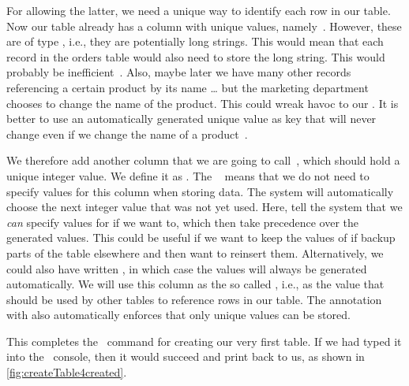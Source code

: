 For allowing the latter, we need a unique way to identify each row in our table.
Now our table already has a column with unique values, namely~.
However, these are of type , i.e., they are potentially long strings.
This would mean that each record in the orders table would also need to store the long  string.
This would probably be inefficient~\cite{SE:DA:2014VPKM}.
Also, maybe later we have many other records referencing a certain product by its name {\dots} but the marketing department chooses to change the name of the product.
This could wreak havoc to our \db.
It is better to use an automatically generated unique value as key that will never change even if we change the name of a product~\cite{B2025DS:SBPASG}.%
%
\begin{sloppypar}%
We therefore add another column that we are going to call~, which should hold a unique integer value.
We define it as .
The ~\cite{PGDG:PD:IC,PGDG:PD:GC} means that we do not need to specify values for this column when storing data.
The system will automatically choose the next integer value that was not yet used.
Here,  tell the system that we \emph{can} specify values for  if we want to, which then take precedence over the generated values.
This could be useful if we want to keep the values of  if backup parts of the table elsewhere and then want to reinsert them.
Alternatively, we could also have written , in which case the  values will always be generated automatically.
We will use this column as the so called , i.e., as the value that should be used by other tables to reference rows in our  table.
The annotation with  also automatically enforces that only unique values can be stored.%
\end{sloppypar}%
%
%
%
%
%
This completes the \sql\ command for creating our very first table.
If we had typed it into the \psql\ console, then it would succeed and print  back to us, as shown in \cref{fig:createTable4created}.

